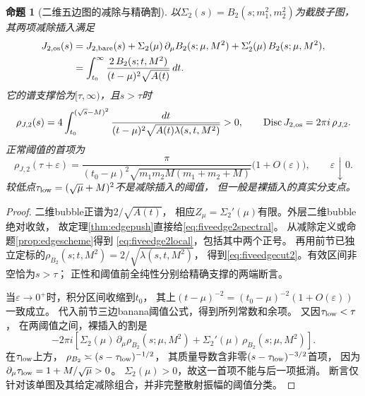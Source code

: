 \documentclass[11pt,a4paper]{ctexart}
\theoremstyle{cnplain}\newtheorem{theorem}{定理}[section]
\newtheorem{proposition}[theorem]{命题}
\theoremstyle{definition}\newtheorem{definition}[theorem]{定义}
\theoremstyle{remark}\newtheorem{remark}[theorem]{注}
\begin{document}
\begin{proposition}[二维五边图的减除与精确割]\label{prop:fiveedge2}
以$\Sigma_2(s)=B_2(s;m_1^2,m_2^2)$为截肢子图，
其两项减除插入满足
\begin{align}
 J_{2,\rm os}(s)
  &=J_{2,\rm bare}(s)
       +\Sigma_2(\mu)\,\partial_\mu B_2(s;\mu,M^2)
       +\Sigma_2'(\mu)\,B_2(s;\mu,M^2),\label{eq:fiveedge2local}\\
  &=\int_{t_0}^{\infty}
       \frac{2\,B_2(s;t,M^2)}
            {(t-\mu)^2\sqrt{A(t)}}\,dt .
 \label{eq:fiveedge2spectral}
\end{align}
它的谱支撑恰为$[\tau,\infty)$，且$s>\tau$时
\begin{equation}\label{eq:fiveedgecut2}
 \rho_{J,2}(s)=4\int_{t_0}^{(\sqrt s-M)^2}
       \frac{dt}{(t-\mu)^2
          \sqrt{A(t)\lambda(s,t,M^2)}}>0,\qquad
 \operatorname{Disc}J_{2,\rm os}=2\pi i\,\rho_{J,2}.
\end{equation}
正常阈值的首项为
\[
 \rho_{J,2}(\tau+\varepsilon)
 =\frac{\pi}
 {(t_0-\mu)^2\sqrt{m_1m_2M(m_1+m_2+M)}}
       \bigl(1+O(\varepsilon)\bigr),\qquad\varepsilon\downarrow0.
\]
较低点$\tau_{\rm low}=(\sqrt\mu+M)^2$不是减除插入的阈值，
但一般是裸插入的真实分支点。
\end{proposition}
\begin{proof}
二维bubble正谱为$2/\sqrt{A(t)}$，
相应$Z_\mu=\Sigma_2'(\mu)$有限。外层二维bubble绝对收敛，
故定理\ref{thm:edgepush}直接给\eqref{eq:fiveedge2spectral}。
从减除定义或命题\ref{prop:edgescheme}得到
\eqref{eq:fiveedge2local}，包括其中两个正号。
再用前节已独立定标的$\rho_{B_2}(s;t,M^2)=2/\sqrt{\lambda(s,t,M^2)}$，
得到\eqref{eq:fiveedgecut2}。有效区间非空恰为$s>\tau$；
正性和阈值前全纯性分别给精确支撑的两端断言。

当$\varepsilon\to0^+$时，积分区间收缩到$t_0$，
其上$(t-\mu)^{-2}=(t_0-\mu)^{-2}(1+O(\varepsilon))$一致成立。
代入前节三边banana阈值公式，得到所列常数和余项。
又因$\tau_{\rm low}<\tau$，
在两阈值之间，裸插入的割是
\[
 -2\pi i\left[
 \Sigma_2(\mu)\,\partial_\mu\rho_{B_2}(s;\mu,M^2)
 +\Sigma_2'(\mu)\,\rho_{B_2}(s;\mu,M^2)\right].
\]
在$\tau_{\rm low}$上方，
$\rho_{B_2}\asymp(s-\tau_{\rm low})^{-1/2}$，
其质量导数含非零$(s-\tau_{\rm low})^{-3/2}$首项，
因为$\partial_\mu\tau_{\rm low}=1+M/\sqrt\mu>0$。
$\Sigma_2(\mu)>0$，故这一首项不能与后一项抵消。
断言仅针对该单图及其给定减除组合，并非完整散射振幅的阈值分类。
\end{proof}
\end{document}
